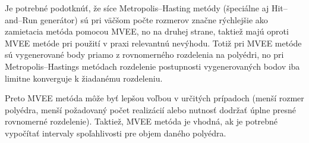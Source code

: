 Je potrebné podotknúť, že síce Metropolis--Hasting metódy (špeciálne aj Hit--and--Run generátor) sú pri väčšom počte rozmerov značne rýchlejšie ako zamietacia metóda pomocou MVEE, no na druhej strane, taktiež majú oproti MVEE metóde pri použití v praxi relevantnú nevýhodu. Totiž pri MVEE metóde sú vygenerované body priamo z rovnomerného rozdelenia na polyédri, no pri Metropolis--Hastings metódach rozdelenie postupnosti vygenerovaných bodov iba limitne konverguje k žiadanému rozdeleniu.

Preto MVEE metóda môže byť lepšou voľbou v určitých prípadoch (menší rozmer polyédra, menší požadovaný počet realizácií alebo nutnosť dodržať úplne presné rovnomerné rozdelenie). Taktiež, MVEE metóda je vhodná, ak je potrebné vypočítať intervaly spoľahlivosti pre objem daného polyédra. 